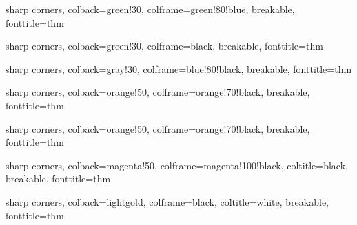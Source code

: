%
{sharp corners, colback=green!30, colframe=green!80!blue, breakable, fonttitle=\bfseries}{thm}

%
{sharp corners, colback=green!30, colframe=black, breakable, fonttitle=\bfseries}{thm}

%
{sharp corners, colback=gray!30, colframe=blue!80!black, breakable, fonttitle=\bfseries}{thm}

%
{sharp corners, colback=orange!50, colframe=orange!70!black, breakable, fonttitle=\bfseries}{thm}

%
{sharp corners, colback=orange!50, colframe=orange!70!black, breakable, fonttitle=\bfseries}{thm}

%
{sharp corners, colback=magenta!50, colframe=magenta!100!black, coltitle=black, breakable, fonttitle=\bfseries}{thm}

%
{sharp corners, colback=lightgold, colframe=black, coltitle=white, breakable, fonttitle=\bfseries}{thm}






\newtheorem{revquest}[thm]{\textcolor{red}{\bf Review Question:}}



